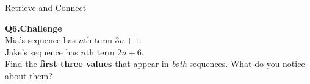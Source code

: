 \documentclass{beamer}
\newcommand{\ashow}[1]{\uncover<2->{\textcolor{red}{\small #1}}}
\begin{document}
\begin{frame}[shrink=5]{Retrieve and Connect}
\begin{minipage}[t]{0.48\textwidth}
    \vspace{0.45cm}

        \small\textbf{Q6.\;Challenge}\\
    \footnotesize
    Mia's sequence has $n$th term $3n+1$.\\
    Jake's sequence has $n$th term $2n+6$.\\
    Find the \textbf{first three values} that appear
    in \emph{both} sequences.
    What do you notice about them?\\[0.2em]
    \ashow{Shared values:\;$10,\;16,\;22,\;\ldots$
           \;(they increase by 6 each time).}
    
  \end{minipage}

\end{frame}
\end{document}
